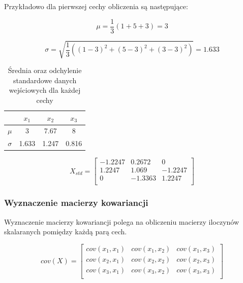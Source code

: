 \documentclass{article}
\begin{document}
Przykładowo dla pierwszej cechy obliczenia są następujące:

\begin{equation*}
    \mu = \frac{1}{3} (1 + 5 + 3) = 3
\end{equation*}

\begin{equation*}
    \sigma = \sqrt{\frac{1}{3} ((1 - 3)^2 + (5 - 3)^2 + (3 - 3)^2)} = 1.633
\end{equation*}

\begin{table}[H]
    \centering
    \begin{tabular}{|c|c|c|c|}
        \hline
        & $x_1$ & $x_2$ & $x_3$ \\
        \hline
        $\mu$ & 3 & 7.67 & 8 \\
        \hline
        $\sigma$ & 1.633 & 1.247 & 0.816 \\
        \hline
    \end{tabular}
    \caption{Średnia oraz odchylenie standardowe danych wejściowych dla każdej cechy}
\end{table}

\begin{equation}
    X_{std} = 
    \begin{bmatrix}
        -1.2247 & 0.2672 & 0 \\
        1.2247 & 1.069 & -1.2247 \\
        0 & -1.3363 & 1.2247 \\
    \end{bmatrix}
\end{equation}

\subsubsection*{Wyznaczenie macierzy kowariancji}

Wyznaczenie macierzy kowariancji polega na obliczeniu
macierzy iloczynów skalaranych pomiędzy każdą parą cech.

\begin{equation}
    cov(X) = \begin{bmatrix}
        cov(x_1, x_1) & cov(x_1, x_2) & cov(x_1, x_3) \\
        cov(x_2, x_1) & cov(x_2, x_2) & cov(x_2, x_3) \\
        cov(x_3, x_1) & cov(x_3, x_2) & cov(x_3, x_3) \\
    \end{bmatrix}
\end{equation}
\end{document}

